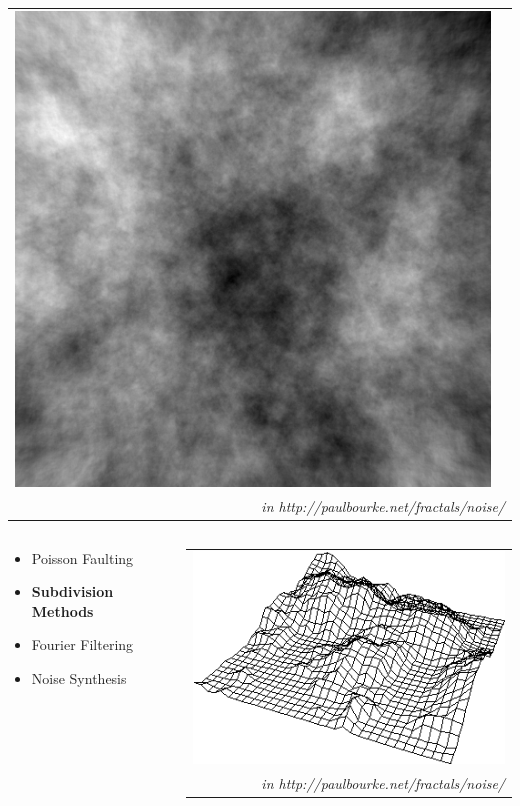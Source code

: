 \documentclass[aspectratio=169]{beamer}
\newenvironment{myframe}[1][t]{\begin{frame}[#1]{\secname}{\subsecname}}{\end{frame}}
\begin{document}
\begin{myframe}
\begin{columns}[T]
\begin{column}{0.5\linewidth}
\begin{tabular}{lr}
					\includegraphics[width=0.35\linewidth]{images/background/generation/plane100000} \\
					\multicolumn{2}{r}{\tiny\textit{in http://paulbourke.net/fractals/noise/}}
				\end{tabular}
			\end{column}
		\end{columns}
	\end{myframe}
	
	\begin{myframe}
		
		\begin{columns}[T]
			\begin{column}{0.45\linewidth}
				\begin{itemize}
					\item Poisson Faulting
					\item \textbf{Subdivision Methods}
					\item Fourier Filtering
					\item Noise Synthesis
				\end{itemize}
			\end{column}
			
			\begin{column}{0.5\linewidth}
				\begin{tabular}{r}
					\includegraphics[width=0.7\linewidth]{images/background/generation/subdivision} \\
					\tiny\textit{in http://paulbourke.net/fractals/noise/}
				\end{tabular}
			\end{column}
		\end{columns}
	\end{myframe}
	
\end{document}
